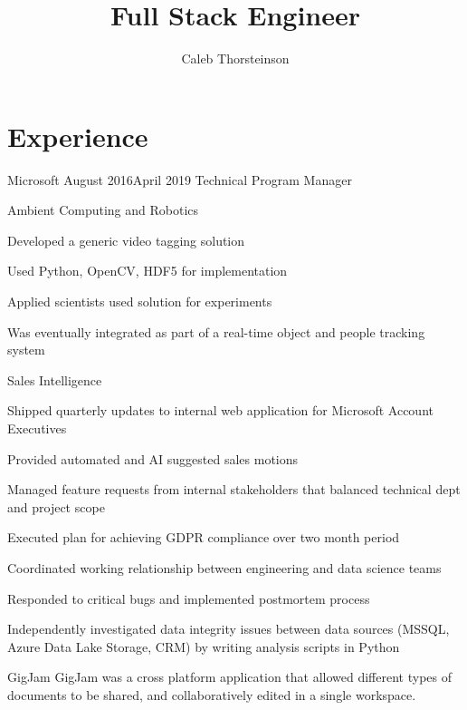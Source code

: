 \documentclass[]{../resume}
\author{Caleb Thorsteinson}
\title{Full Stack Engineer}
\begin{document}
\raggedright


\section{Experience}

\begin{employer}[../microsoft]{Microsoft} {August 2016}{April 2019}
  {Technical Program Manager}
\begin{team}{Ambient Computing and Robotics}
  \begin{bullets}
  \item Developed a generic video tagging solution
  \item Used Python, OpenCV, HDF5 for implementation
  \item Applied scientists used solution for experiments
  \item Was eventually integrated as part
    of a real-time object and people
    tracking system
  \end{bullets}
\end{team}
\begin{team}{Sales Intelligence}
  \begin{bullets}
  \item Shipped quarterly updates
    to internal web application for Microsoft Account Executives
  \item Provided automated and AI suggested sales motions
  \item Managed feature requests
    from internal stakeholders
    that balanced technical dept
    and project scope
  \item Executed plan for achieving GDPR compliance
    over two month period
  \item Coordinated working relationship
    between engineering and
    data science teams
  \item Responded to critical bugs
    and implemented postmortem process
  \item Independently investigated data integrity issues
    between data sources (MSSQL, Azure Data Lake Storage, CRM)
    by writing analysis scripts in Python
  \end{bullets}
\end{team}
\begin{team}{GigJam}
  GigJam was a cross platform application
  that allowed different types of documents
  to be shared,
  and collaboratively edited
  in a single workspace.


\end{team}
\end{employer}
\end{document}

